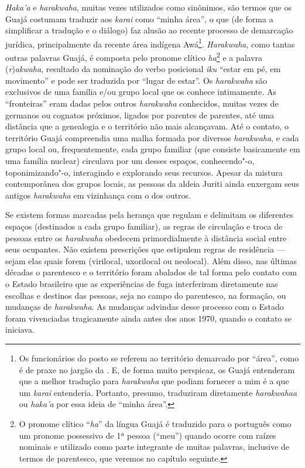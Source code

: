 \emph{Haka'a} e \emph{harakwaha}, muitas vezes utilizados como
sinônimos, são termos que os Guajá costumam traduzir aos \emph{karai}
como ``minha área'', o que (de forma a simplificar a tradução e o diálogo)
faz alusão ao recente processo de demarcação jurídica, principalmente da
recente área indígena Awá\footnote{Os funcionários do posto se
  referem ao território demarcado por ``área'', como é de praxe no jargão
  da . E, de forma muito perspicaz, os Guajá entenderam que a
  melhor tradução para \emph{harakwaha} que podiam fornecer a mim é a
  que um \emph{karai} entenderia. Portanto, presumo, traduziram
  diretamente \emph{harakwahaa} ou \emph{haka'a} por essa ideia de
  ``minha área''.}. \emph{Harakwaha}, como tantas outras palavras Guajá, é
composta pelo pronome clítico \emph{ha}\footnote{O pronome clítico
  ``\emph{ha}'' da língua Guajá é traduzido para o português como um
  pronome possessivo de 1ª pessoa (``meu'') quando ocorre com raízes
  nominais e utilizado como parte integrante de muitas palavras,
  inclusive de termos de parentesco, que veremos no capítulo seguinte.}
e a palavra (\emph{r})\emph{akwaha}, resultado da nominação do verbo
posicional \emph{iku} ``estar em pé, em movimento'' e pode ser traduzida
por ``lugar de estar''. Os \emph{harakwaha} são exclusivos de uma família
e/ou grupo local que os conhece intimamente. As ``fronteiras'' eram dadas
pelos outros \emph{harakwaha} conhecidos, muitas vezes de germanos ou
cognatos próximos, ligados por parentes de parentes, até uma distância
que a genealogia e o território não mais alcançavam. Até o contato, o
território Guajá compreendia uma malha formada por diversos
\emph{harakwaha}, e cada grupo local ou, frequentemente, cada grupo
familiar (que consiste basicamente em uma família nuclear) circulava por
um desses espaços, conhecendo"-o, toponimizando"-o, interagindo e
explorando seus recursos. Apesar da mistura contemporânea dos grupos
locais, as pessoas da aldeia Juriti ainda enxergam seus antigos
\emph{harakwaha} em vizinhança com o dos outros.

Se existem formas marcadas pela herança que regulam e delimitam os
diferentes espaços (destinados a cada grupo familiar), as regras de
circulação e troca de pessoas entre os \emph{harakwaha} obedecem
primordialmente à distância social entre seus ocupantes. Não existem
prescrições que estipulem regras de residência --- sejam elas quais forem
(virilocal, uxorilocal ou neolocal). Além disso, nas últimas décadas o
parentesco e o território foram abalados de tal forma pelo contato com o
Estado brasileiro que as experiências de fuga interferiram diretamente
nas escolhas e destinos das pessoas, seja no campo do parentesco, na
formação, ou mudanças de \emph{harakwaha}. As mudanças advindas desse
processo com o Estado foram vivenciadas tragicamente ainda antes dos
anos 1970, quando o contato se iniciava.

